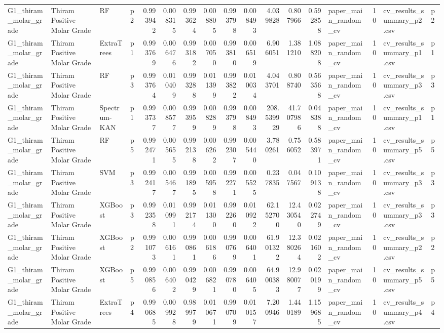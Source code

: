 \begin{tabular}{llllrrrrrrrrrlrll}
G1_thiram_molar_grade & Thiram Positive Molar Grade & RF & p2 & 0.993942 & 0.008315 & 0.993624 & 0.008805 & 0.993798 & 0.008493 & 4.039828 & 0.807966 & 0.592858 & paper_main_random_cv & 10 & cv_results_summary_p2.csv & p2 \\
G1_thiram_molar_grade & Thiram Positive Molar Grade & ExtraTrees & p1 & 0.993769 & 0.006476 & 0.993182 & 0.007050 & 0.993810 & 0.006519 & 6.906051 & 1.381210 & 1.088208 & paper_main_random_cv & 10 & cv_results_summary_p1.csv & p1 \\
G1_thiram_molar_grade & Thiram Positive Molar Grade & RF & p3 & 0.993764 & 0.010409 & 0.993288 & 0.011399 & 0.993822 & 0.010034 & 4.043701 & 0.808740 & 0.563568 & paper_main_random_cv & 10 & cv_results_summary_p3.csv & p3 \\
G1_thiram_molar_grade & Thiram Positive Molar Grade & Spectrum-KAN & p1 & 0.993737 & 0.008577 & 0.993959 & 0.008289 & 0.993798 & 0.008493 & 208.539929 & 41.707986 & 0.048388 & paper_main_random_cv & 10 & cv_results_summary_p1.csv & p1 \\
G1_thiram_molar_grade & Thiram Positive Molar Grade & RF & p5 & 0.992471 & 0.005655 & 0.992138 & 0.006262 & 0.992307 & 0.005440 & 3.780261 & 0.756052 & 0.583971 & paper_main_random_cv & 10 & cv_results_summary_p5.csv & p5 \\
G1_thiram_molar_grade & Thiram Positive Molar Grade & SVM & p3 & 0.992417 & 0.005467 & 0.991895 & 0.005958 & 0.992271 & 0.005525 & 0.237835 & 0.047567 & 0.109138 & paper_main_random_cv & 10 & cv_results_summary_p3.csv & p3 \\
G1_thiram_molar_grade & Thiram Positive Molar Grade & XGBoost & p3 & 0.992358 & 0.010991 & 0.992174 & 0.011300 & 0.992260 & 0.010922 & 62.152700 & 12.430540 & 0.022749 & paper_main_random_cv & 10 & cv_results_summary_p3.csv & p3 \\
G1_thiram_molar_grade & Thiram Positive Molar Grade & XGBoost & p2 & 0.991073 & 0.006161 & 0.990861 & 0.006186 & 0.990769 & 0.006401 & 61.901322 & 12.380264 & 0.021602 & paper_main_random_cv & 10 & cv_results_summary_p2.csv & p2 \\
G1_thiram_molar_grade & Thiram Positive Molar Grade & XGBoost & p5 & 0.990856 & 0.006402 & 0.990429 & 0.006821 & 0.990780 & 0.006405 & 64.900383 & 12.980077 & 0.020199 & paper_main_random_cv & 10 & cv_results_summary_p5.csv & p5 \\
G1_thiram_molar_grade & Thiram Positive Molar Grade & ExtraTrees & p4 & 0.990685 & 0.009928 & 0.989979 & 0.010671 & 0.990709 & 0.010157 & 7.200946 & 1.440189 & 1.159685 & paper_main_random_cv & 10 & cv_results_summary_p4.csv & p4 \\

\end{tabular}
